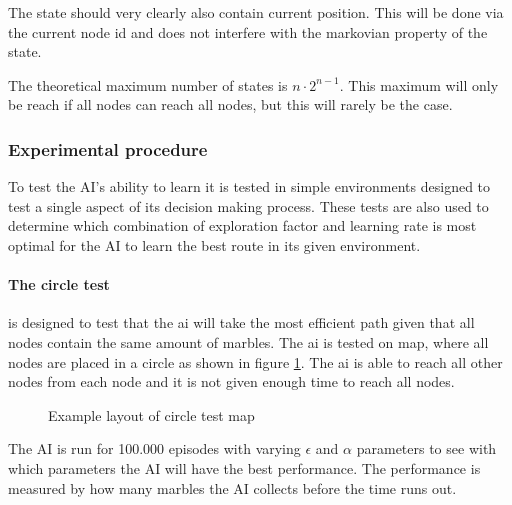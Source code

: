 \documentclass[../../../Main.tex]{subfiles}
\begin{document}
The state should very clearly also contain current position. This will be done via the current
node id and does not interfere with the markovian property of the state.

The theoretical maximum number of states is $n\cdot 2^{n-1}$. This maximum will only be reach if
all nodes can reach all nodes, but this will rarely be the case.


%		
%		

\subsubsection{Experimental procedure}%
\label{ssub:experimental_procedure}

To test the AI's ability to learn it is tested in simple environments designed to test a single
aspect of its decision making process. These tests are also used to determine which combination of
exploration factor and learning rate is most optimal for the AI to learn the best route in its given
environment.

\paragraph{The circle test}%
\label{par:the_circle_test}

is designed to test that the ai will take the most efficient path given that all nodes contain
the same amount of marbles.
The ai is tested on map, where all nodes are placed in a circle as shown in figure
\ref{fig:q:circle_test}. The ai is able to reach all other nodes from each node and it is not
given enough time to reach all nodes.

\begin{figure}[h]
	\center
	\caption{Example layout of circle test map}
	\label{fig:q:circle_test}
\end{figure}

The AI is run for 100.000 episodes with varying $\epsilon$ and $\alpha$ parameters to see with which
parameters the AI will have the best performance. The performance is measured by how many marbles
the AI collects before the time runs out.
\end{document}
